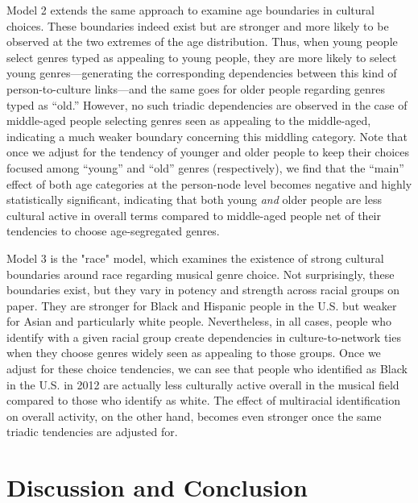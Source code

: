 \documentclass[preprint,12pt,authoryear]{elsarticle}
\begin{document}
Model 2 extends the same approach to examine age boundaries in cultural choices. These boundaries indeed exist but are stronger and more likely to be observed at the two extremes of the age distribution. Thus, when young people select genres typed as appealing to young people, they are more likely to select young genres---generating the corresponding dependencies between this kind of person-to-culture links---and the same goes for older people regarding genres typed as ``old.'' However, no such triadic dependencies are observed in the case of middle-aged people selecting genres seen as appealing to the middle-aged, indicating a much weaker boundary concerning this middling category. Note that once we adjust for the tendency of younger and older people to keep their choices focused among ``young'' and ``old'' genres (respectively), we find that the ``main'' effect of both age categories at the person-node level becomes negative and highly statistically significant, indicating that both young \textit{and} older people are less cultural active in overall terms compared to middle-aged people net of their tendencies to choose age-segregated genres. 

Model 3 is the "race" model, which examines the existence of strong cultural boundaries around race regarding musical genre choice. Not surprisingly, these boundaries exist, but they vary in potency and strength across racial groups on paper. They are stronger for Black and Hispanic people in the U.S. but weaker for Asian and particularly white people.  Nevertheless, in all cases, people who identify with a given racial group create dependencies in culture-to-network ties when they choose genres widely seen as appealing to those groups. Once we adjust for these choice tendencies, we can see that people who identified as Black in the U.S. in 2012 are actually less culturally active overall in the musical field compared to those who identify as white. The effect of multiracial identification on overall activity, on the other hand, becomes even stronger once the same triadic tendencies are adjusted for. 

\section{Discussion and Conclusion}
\label{sec:disc}
\newpage

\newpage

\newpage


\end{document}
